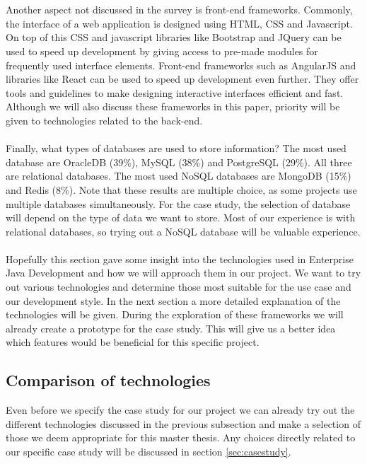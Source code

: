\documentclass[12pt]{article}
\begin{document}
\begin{multicols}{2}
\\\\
Another aspect not discussed in the survey is front-end frameworks. Commonly, the interface of a web application is designed using HTML, CSS and Javascript. On top of this CSS and javascript libraries like Bootstrap and JQuery can be used to speed up development by giving access to pre-made modules for frequently used interface elements. Front-end frameworks such as AngularJS and libraries like React can be used to speed up development even further. They offer tools and guidelines to make designing interactive interfaces efficient and fast. Although we will also discuss these frameworks in this paper, priority will be given to technologies related to the back-end.
\\\\
Finally, what types of databases are used to store information? The most used database are OracleDB (39\%), MySQL (38\%) and PostgreSQL (29\%). All three are relational databases. The most used NoSQL databases are MongoDB (15\%) and Redis (8\%). Note that these results are multiple choice, as some projects use multiple databases simultaneously. For the case study, the selection of database will depend on the type of data we want to store. Most of our experience is with relational databases, so trying out a NoSQL database will be valuable experience.
\\\\
Hopefully this section gave some insight into the technologies used in Enterprise Java Development and how we will approach them in our project. We want to try out various technologies and determine those most suitable for the use case and our development style. In the next section a more detailed explanation of the technologies will be given. During the exploration of these frameworks we will already create a prototype for the case study. This will give us a better idea which features would be beneficial for this specific project.


\subsection{Comparison of technologies}\label{sec:comparison}
Even before we specify the case study for our project we can already try out the different technologies discussed in the previous subsection and make a selection of those we deem appropriate for this master thesis. Any choices directly related to our specific case study will be discussed in section \ref{sec:casestudy}.


\end{multicols}
\end{document}
